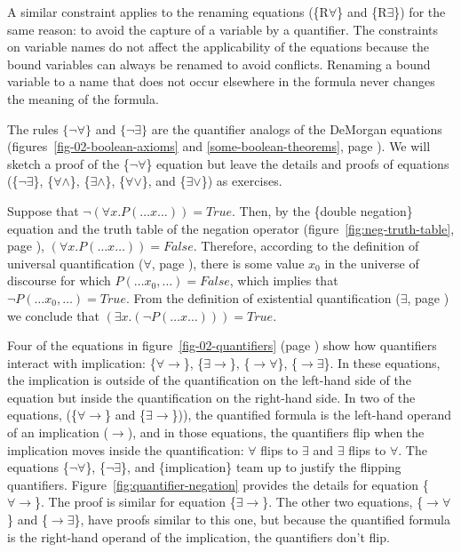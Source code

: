 {{A similar constraint applies to the renaming
equations (\{R$\forall$\} and \{R$\exists$\})
for the same reason: to avoid the
capture of a variable by a quantifier.
The constraints on variable names do not affect the applicability of
the equations because the bound variables can
always be renamed to avoid conflicts.
Renaming a bound variable to a name that does
not occur elsewhere in the formula never changes
the meaning of the formula.

\label{why-neg-forall}The
rules $\{\neg\forall\}$ and $\{\neg\exists\}$
are the quantifier analogs of the DeMorgan equations
(figures~\ref{fig-02-boolean-axioms} and \ref{some-boolean-theorems}, page \pageref{some-boolean-theorems}).
We will sketch a proof of the \{$\neg\forall$\} equation
but leave the details and proofs of equations
(\{$\neg\exists$\}, \{$\forall\wedge$\},
\{$\exists\wedge$\}, \{$\forall\vee$\}, and \{$\exists\vee$\}) as exercises.

Suppose that $\neg(\forall x.P(\dots x \dots)) = True$.
Then, by the \{double negation\} equation and the truth table of the negation operator
(figure~\ref{fig:neg-truth-table}, page \pageref{fig:neg-truth-table}),
$(\forall x.P(\dots x \dots)) = False$.
Therefore, according to the definition of universal quantification
($\forall$, page \pageref{def:universal-quantifier}),
there is some value $x_0$ in the universe of discourse for which
$P(\dots x_0, \dots)=False$, which implies that
$\neg P(\dots x_0, \dots)=True$.
From the definition of existential quantification
($\exists$, page \pageref{def:existential-quantifier})
we conclude that $(\exists x.(\neg P(\dots x \dots))) = True$.

Four of the equations
in figure~\ref{fig-02-quantifiers} (page \pageref{fig-02-quantifiers})
show how quantifiers interact with implication:
\{${\forall}{\rightarrow}$\},
\{${\exists}{\rightarrow}$\},
\{${\rightarrow}{\forall}$\},
\{${\rightarrow}{\exists}$\}.
In these equations, the implication is outside of the quantification
on the left-hand side of the equation but inside the quantification
on the right-hand side.
In two of the equations, (\{${\forall}{\rightarrow}$\} and \{${\exists}{\rightarrow}$\})),
the quantified formula is the left-hand operand of an implication ($\rightarrow$),
and in those equations, the quantifiers flip when the implication moves inside
the quantification: $\forall$ flips to $\exists$ and $\exists$ flips to $\forall$.
The equations \{$\neg\forall$\}, \{$\neg\exists$\}, and \{implication\}
team up to justify the flipping quantifiers.
Figure~\ref{fig:quantifier-negation} provides the details for
equation \{${\forall}{\rightarrow}$\}.
The proof is similar for equation \{${\exists}{\rightarrow}$\}.
The other two equations, \{${\rightarrow}{\forall}$\} and \{${\rightarrow}{\exists}$\},
have proofs similar to this one, but because the quantified
formula is the right-hand operand of the implication,
the quantifiers don't flip.

}}

